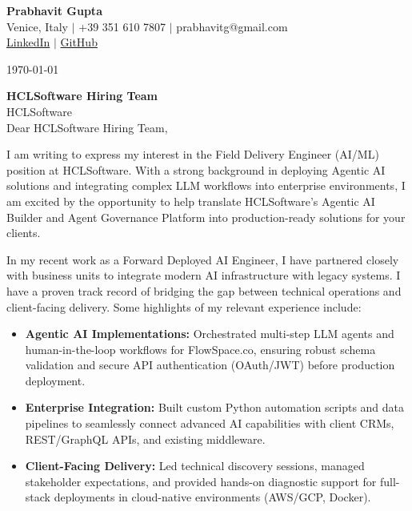 \documentclass[11pt,a4paper]{article}
\begin{document}
\begin{center}
    {\huge \textbf{Prabhavit Gupta}} \\
    \vspace{0.2em}
    Venice, Italy $|$ +39 351 610 7807 $|$ prabhavitg@gmail.com \\
    \href{https://www.linkedin.com/in/prabhavit/}{LinkedIn} $|$ \href{https://github.com/prab-gupta}{GitHub}
\end{center}

\vspace{2em}
\noindent \today

\vspace{1em}
\noindent \textbf{HCLSoftware Hiring Team} \\
\noindent HCLSoftware \\

\vspace{1em}
\noindent Dear HCLSoftware Hiring Team,

\vspace{1em}
\noindent I am writing to express my interest in the Field Delivery Engineer (AI/ML) position at HCLSoftware. With a strong background in deploying Agentic AI solutions and integrating complex LLM workflows into enterprise environments, I am excited by the opportunity to help translate HCLSoftware's Agentic AI Builder and Agent Governance Platform into production-ready solutions for your clients.

\vspace{1em}
\noindent In my recent work as a Forward Deployed AI Engineer, I have partnered closely with business units to integrate modern AI infrastructure with legacy systems. I have a proven track record of bridging the gap between technical operations and client-facing delivery. Some highlights of my relevant experience include:

\begin{itemize}
    \item \textbf{Agentic AI Implementations:} Orchestrated multi-step LLM agents and human-in-the-loop workflows for FlowSpace.co, ensuring robust schema validation and secure API authentication (OAuth/JWT) before production deployment.
    \item \textbf{Enterprise Integration:} Built custom Python automation scripts and data pipelines to seamlessly connect advanced AI capabilities with client CRMs, REST/GraphQL APIs, and existing middleware.
    \item \textbf{Client-Facing Delivery:} Led technical discovery sessions, managed stakeholder expectations, and provided hands-on diagnostic support for full-stack deployments in cloud-native environments (AWS/GCP, Docker).
\end{itemize}
\end{document}
